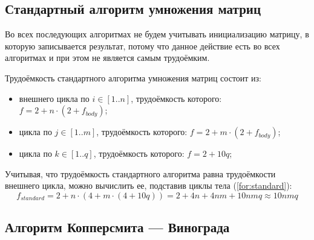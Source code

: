 \subsection{Стандартный алгоритм умножения матриц}

Во всех последующих алгоритмах не будем учитывать инициализацию матрицу, в которую записывается результат, потому что данное действие есть во всех алгоритмах и при этом не является самым трудоёмким.

Трудоёмкость стандартного алгоритма умножения матриц состоит из:
\begin{itemize}
    \item внешнего цикла по $i \in [1..n]$, трудоёмкость которого: $f = 2 + n \cdot (2 + f_{body})$;
    \item цикла по $j \in [1..m]$, трудоёмкость которого: $f = 2 + m \cdot (2 + f_{body})$;
    \item цикла по $k \in [1..q]$, трудоёмкость которого: $f = 2 + 10q$;
\end{itemize}

Учитывая, что трудоёмкость стандартного алгоритма равна трудоёмкости внешнего цикла, можно вычислить ее, подставив циклы тела (\ref{for:standard}):
\begin{equation}
    \label{for:standard}
    f_{standard} = 2 + n \cdot (4 + m \cdot (4 + 10q)) = 2 + 4n + 4nm + 10nmq \approx 10nmq
\end{equation}

\subsection{Алгоритм Копперсмита — Винограда}

